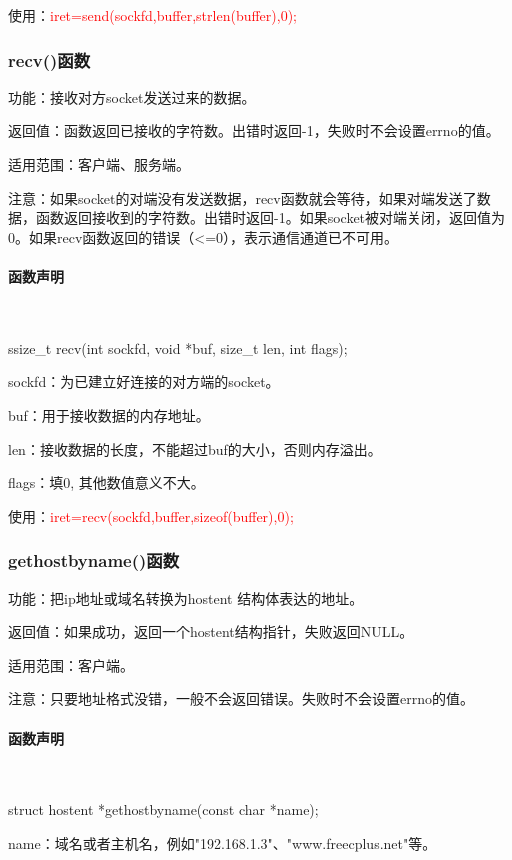 \documentclass[UTF8]{article}%
\begin{document}
使用：\textcolor{red}{iret=send(sockfd,buffer,strlen(buffer),0);}

\subsubsection{recv()函数}

功能：接收对方socket发送过来的数据。

返回值：函数返回已接收的字符数。出错时返回-1，失败时不会设置errno的值。

适用范围：客户端、服务端。

注意：如果socket的对端没有发送数据，recv函数就会等待，如果对端发送了数据，函数返回接收到的字符数。出错时返回-1。如果socket被对端关闭，返回值为0。如果recv函数返回的错误（<=0），表示通信通道已不可用。

\paragraph{函数声明}~{}

ssize\_t recv(int sockfd, void *buf, size\_t len, int flags);

sockfd：为已建立好连接的对方端的socket。

buf：用于接收数据的内存地址。

len：接收数据的长度，不能超过buf的大小，否则内存溢出。

flags：填0, 其他数值意义不大。

使用：\textcolor{red}{iret=recv(sockfd,buffer,sizeof(buffer),0);}

\subsubsection{gethostbyname()函数}

功能：把ip地址或域名转换为hostent 结构体表达的地址。

返回值：如果成功，返回一个hostent结构指针，失败返回NULL。

适用范围：客户端。

注意：只要地址格式没错，一般不会返回错误。失败时不会设置errno的值。

\paragraph{函数声明}~{}

struct hostent *gethostbyname(const char *name);

name：域名或者主机名，例如"192.168.1.3"、"www.freecplus.net"等。
\end{document}

